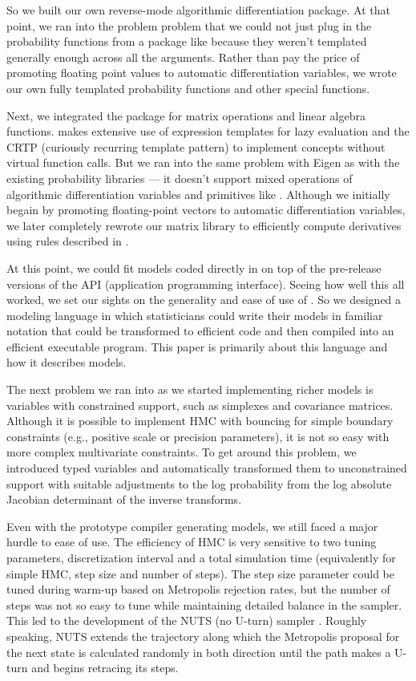 \documentclass[article]{jss}
\begin{document}
So we built our own reverse-mode algorithmic differentiation package.
At that point, we ran into the problem problem that we could not just
plug in the probability functions from a package like  because
they weren't templated generally enough across all the arguments.
Rather than pay the price of promoting floating point values to
automatic differentiation variables, we wrote our own fully templated
probability functions and other special functions.

Next, we integrated the  package  for matrix
operations and linear algebra functions.   makes extensive use of
expression templates for lazy evaluation and the CRTP (curiously
recurring template pattern) to implement concepts without virtual
function calls.  But we ran into the same problem with Eigen as with
the existing probability libraries --- it doesn't support mixed
operations of algorithmic differentiation variables and primitives
like .  Although we initially begain by promoting
floating-point vectors to automatic differentiation variables, we
later completely rewrote our matrix library to efficiently compute
derivatives using rules described in \citep{Giles:??,book:??}.

At this point, we could fit models coded directly in  on
top of the pre-release versions of the  API
(application programming interface).  Seeing how well this all worked,
we set our sights on the generality and ease of use of
.  So we designed a modeling language in which
statisticians could write their models in familiar notation that could
be transformed to efficient  code and then compiled into
an efficient executable program.  This paper is primarily about this
language and how it describes models.
 
The next problem we ran into as we started implementing richer models
is variables with constrained support, such as simplexes and
covariance matrices.  Although it is possible to implement HMC with
bouncing for simple boundary constraints (e.g., positive scale or
precision parameters), it is not so easy with more complex
multivariate constraints.  To get around this problem, we introduced
typed variables and automatically transformed them to unconstrained
support with suitable adjustments to the log probability from the log
absolute Jacobian determinant of the inverse transforms.

Even with the prototype compiler generating models, we still faced a
major hurdle to ease of use. The efficiency of HMC is very sensitive
to two tuning parameters, discretization interval and a total
simulation time (equivalently for simple HMC, step size and number of
steps).  The step size parameter could be tuned during warm-up based
on Metropolis rejection rates, but the number of steps was not so easy
to tune while maintaining detailed balance in the sampler.  This led
to the development of the NUTS (no U-turn) sampler
\citep{Hoffman-Gelman:2012}.  Roughly speaking, NUTS extends the
trajectory along which the Metropolis proposal for the next state is
calculated randomly in both direction until the path makes a U-turn
and begins retracing its steps.
\end{document}
